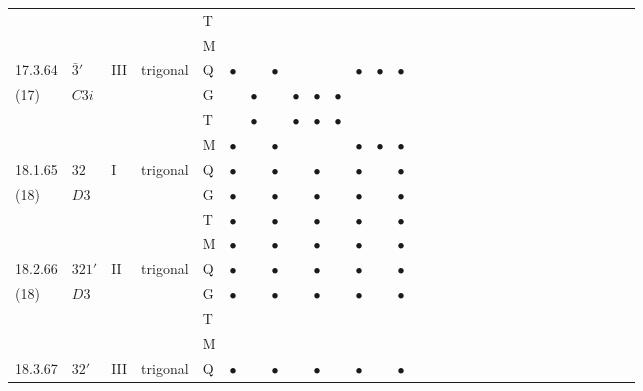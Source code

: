 \documentclass[fleqn,9pt,landscape]{jsarticle}
\begin{document}
\begin{longtable}{lllll|l|l|l|l|l|l|l|l|l|ll|ll|ll|ll|ll|ll|ll|ll}
 &  &  &  & T &  &  &  &  &  &  &  &  &  &  &  &  &  &  &  &  &  &  &  &  &  &  &  &  &  \\
 &  &  &  & M &  &  &  &  &  &  &  &  &  &  &  &  &  &  &  &  &  &  &  &  &  &  &  &  &  \\ \hline
17.3.64 & \texttt{$\bar{3}'$} & III & trigonal & Q & $\bullet$ &  & $\bullet$ &  &  &  & $\bullet$ & $\bullet$ & $\bullet$ &  &  &  &  &  &  &  &  &  &  &  &  &  &  &  &  \\
(17) & $C3i$ &  &  & G &  & $\bullet$ &  & $\bullet$ & $\bullet$ & $\bullet$ &  &  &  &  &  &  &  &  &  &  &  &  &  &  &  &  &  &  &  \\
 &  &  &  & T &  & $\bullet$ &  & $\bullet$ & $\bullet$ & $\bullet$ &  &  &  &  &  &  &  &  &  &  &  &  &  &  &  &  &  &  &  \\
 &  &  &  & M & $\bullet$ &  & $\bullet$ &  &  &  & $\bullet$ & $\bullet$ & $\bullet$ &  &  &  &  &  &  &  &  &  &  &  &  &  &  &  &  \\ \hline
18.1.65 & \texttt{$32$} & I & trigonal & Q & $\bullet$ &  & $\bullet$ &  & $\bullet$ &  & $\bullet$ &  & $\bullet$ &  &  &  &  &  &  &  &  &  &  &  &  &  &  &  &  \\
(18) & $D3$ &  &  & G & $\bullet$ &  & $\bullet$ &  & $\bullet$ &  & $\bullet$ &  & $\bullet$ &  &  &  &  &  &  &  &  &  &  &  &  &  &  &  &  \\
 &  &  &  & T & $\bullet$ &  & $\bullet$ &  & $\bullet$ &  & $\bullet$ &  & $\bullet$ &  &  &  &  &  &  &  &  &  &  &  &  &  &  &  &  \\
 &  &  &  & M & $\bullet$ &  & $\bullet$ &  & $\bullet$ &  & $\bullet$ &  & $\bullet$ &  &  &  &  &  &  &  &  &  &  &  &  &  &  &  &  \\ \hline
18.2.66 & \texttt{$321'$} & II & trigonal & Q & $\bullet$ &  & $\bullet$ &  & $\bullet$ &  & $\bullet$ &  & $\bullet$ &  &  &  &  &  &  &  &  &  &  &  &  &  &  &  &  \\
(18) & $D3$ &  &  & G & $\bullet$ &  & $\bullet$ &  & $\bullet$ &  & $\bullet$ &  & $\bullet$ &  &  &  &  &  &  &  &  &  &  &  &  &  &  &  &  \\
 &  &  &  & T &  &  &  &  &  &  &  &  &  &  &  &  &  &  &  &  &  &  &  &  &  &  &  &  &  \\
 &  &  &  & M &  &  &  &  &  &  &  &  &  &  &  &  &  &  &  &  &  &  &  &  &  &  &  &  &  \\ \hline
18.3.67 & \texttt{$32'$} & III & trigonal & Q & $\bullet$ &  & $\bullet$ &  & $\bullet$ &  & $\bullet$ &  & $\bullet$ &  &  &  &  &  &  &  &  &  &  &  &  &  &  &  &  \\

\end{longtable}
\end{document}
